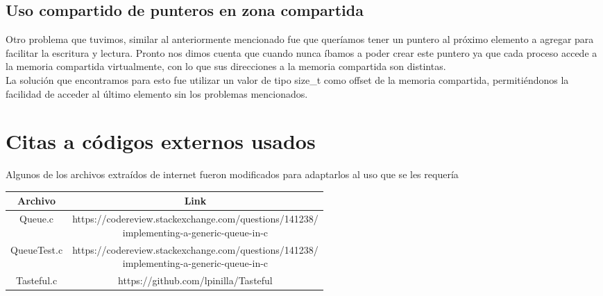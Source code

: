\documentclass[12pt]{article}
\begin{document}
\subsection{Uso compartido de punteros en zona compartida}
Otro problema que tuvimos, similar al anteriormente mencionado fue que quer\'iamos tener un puntero al pr\'oximo elemento a agregar para facilitar la escritura y lectura. Pronto nos dimos cuenta que cuando nunca \'ibamos a poder crear este puntero ya que cada proceso accede a la memoria compartida virtualmente, con lo que sus direcciones a la memoria compartida son distintas.\\

La soluci\'on que encontramos para esto fue utilizar un valor de tipo size\_t como offset de la memoria compartida, permiti\'endonos la facilidad de acceder al \'ultimo elemento sin los problemas mencionados.

\section{Citas a c\'odigos externos usados}

Algunos de los archivos extra\'idos de internet fueron modificados para adaptarlos al uso que se les requer\'ia

\begin{center}
	\begin{table} [!h]
	\begin{tabular}{ |c|c| }
		\hline
		Archivo & Link \\
		\hline
		Queue.c & \makecell{https://codereview.stackexchange.com/questions/141238/ \\ implementing-a-generic-queue-in-c} \\
		\hline
		QueueTest.c & \makecell{ https://codereview.stackexchange.com/questions/141238/ \\ implementing-a-generic-queue-in-c} \\
		\hline
		Tasteful.c & https://github.com/lpinilla/Tasteful \\
		\hline
	\end{tabular}

	\end{table}
\end{center}
	
\end{document}
